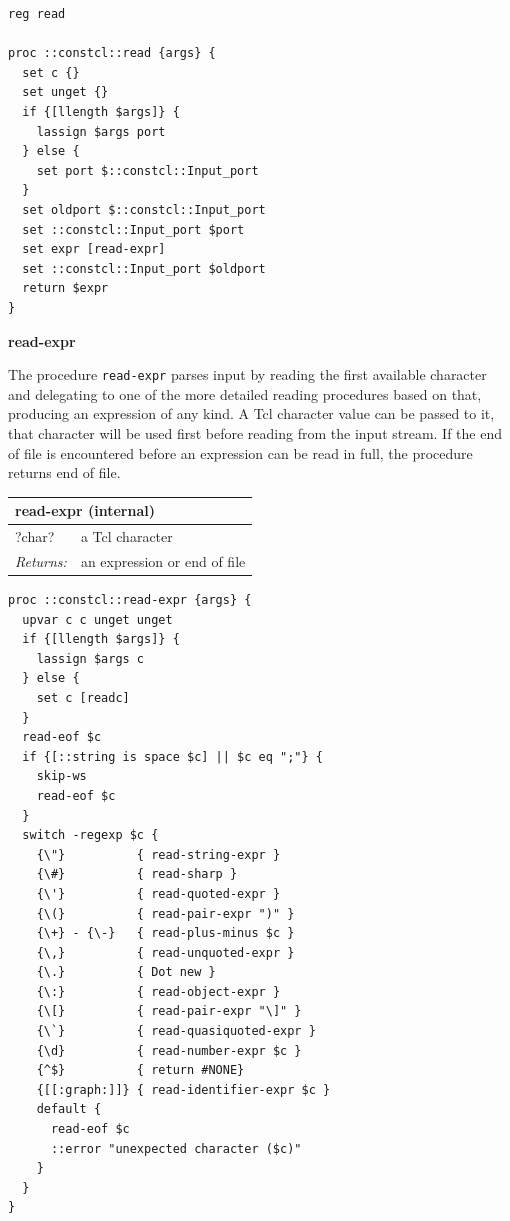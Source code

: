 \documentclass[twoside,9pt]{report}
\begin{document}
\noindent\makebox[\linewidth]{\rule{\linewidth}{0.4pt}}
\begin{lstlisting}
reg read
 
proc ::constcl::read {args} {
  set c {}
  set unget {}
  if {[llength $args]} {
    lassign $args port
  } else {
    set port $::constcl::Input_port
  }
  set oldport $::constcl::Input_port
  set ::constcl::Input_port $port
  set expr [read-expr]
  set ::constcl::Input_port $oldport
  return $expr
}
\end{lstlisting}
\noindent\makebox[\linewidth]{\rule{\linewidth}{0.4pt}}

\textbf{read-expr}


The procedure \texttt{read-expr} parses input by reading the first available character and delegating to one of the more detailed reading procedures based on that, producing an expression of any kind. A Tcl character value can be passed to it, that character will be used first before reading from the input stream. If the end of file is encountered before an expression can be read in full, the procedure returns end of file.

\begin{tabular}{ |l l| }
\hline
\multicolumn{2}{|l|}{read-expr (internal)} \\
\hline
?char? & a Tcl character \\
\textit{Returns:} & an expression or end of file \\
\hline
\end{tabular}

\noindent\makebox[\linewidth]{\rule{\linewidth}{0.4pt}}
\begin{lstlisting}
proc ::constcl::read-expr {args} {
  upvar c c unget unget
  if {[llength $args]} {
    lassign $args c
  } else {
    set c [readc]
  }
  read-eof $c
  if {[::string is space $c] || $c eq ";"} {
    skip-ws
    read-eof $c
  }
  switch -regexp $c {
    {\"}          { read-string-expr }
    {\#}          { read-sharp }
    {\'}          { read-quoted-expr }
    {\(}          { read-pair-expr ")" }
    {\+} - {\-}   { read-plus-minus $c }
    {\,}          { read-unquoted-expr }
    {\.}          { Dot new }
    {\:}          { read-object-expr }
    {\[}          { read-pair-expr "\]" }
    {\`}          { read-quasiquoted-expr }
    {\d}          { read-number-expr $c }
    {^$}          { return #NONE}
    {[[:graph:]]} { read-identifier-expr $c }
    default {
      read-eof $c
      ::error "unexpected character ($c)"
    }
  }
}
\end{lstlisting}
\noindent\makebox[\linewidth]{\rule{\linewidth}{0.4pt}}
\end{document}
